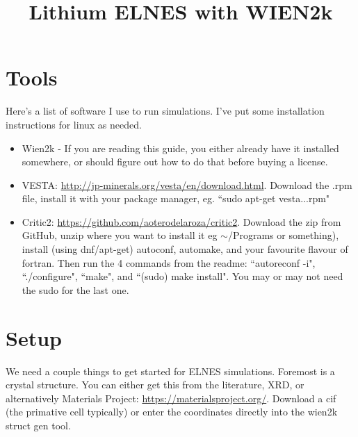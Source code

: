 \documentclass[12pt]{article}
\title{Lithium ELNES with WIEN2k}
\begin{document}
\maketitle

\tableofcontents

\section{Tools}	
Here's a list of software I use to run simulations.  I've put some installation instructions for linux as needed.  

\begin{itemize}
	\item Wien2k  - If you are reading this guide, you either already have it installed somewhere, or should figure out how to do that before buying a license.  
	
	\item  VESTA: \url{http://jp-minerals.org/vesta/en/download.html}.  Download the .rpm file, install it with your package manager, eg. ``sudo apt-get vesta...rpm"
	
	\item Critic2: \url{https://github.com/aoterodelaroza/critic2}.  Download the zip from GitHub, unzip where you want to install it eg $\sim$/Programs or something), install (using dnf/apt-get) autoconf, automake, and your favourite flavour of fortran.  Then run the 4 commands from the readme: ``autoreconf -i", ``./configure", ``make", and ``(sudo) make install".   You may or may not need the sudo for the last one. 
	
\end{itemize}
	
\section{Setup}	

We need a couple things to get started for ELNES simulations.  Foremost is a crystal structure.  You can either get this from the literature, XRD, or alternatively Materials Project: \url{https://materialsproject.org/}.  Download a cif (the primative cell typically) or enter the coordinates directly into the wien2k struct gen tool.  
\end{document}
